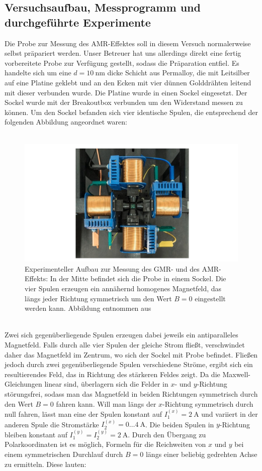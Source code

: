 \documentclass[german,  %
parskip=full,  %
]{scrartcl}
\begin{document}
\subsection{Versuchsaufbau, Messprogramm und durchgeführte Experimente}
Die Probe zur Messung des AMR-Effektes soll in diesem Versuch normalerweise selbst präpariert werden. Unser Betreuer hat uns allerdings direkt eine fertig vorbereitete Probe zur Verfügung gestellt, sodass die Präparation entfiel. Es handelte sich um eine \(d=10 \ \mathrm{nm}\) dicke Schicht aus Permalloy, die mit Leitsilber auf eine Platine geklebt und an den Ecken mit vier dünnen Golddrähten leitend mit dieser verbunden wurde. Die Platine wurde in einen Sockel eingesetzt. Der Sockel wurde mit der Breakoutbox verbunden um den Widerstand messen zu können. Um den Sockel befanden sich vier identische Spulen, die entsprechend der folgenden Abbildung angeordnet waren: \\\\
\begin{figure}[h!]\centering
\includegraphics[width=\textwidth]{Versuchsaufbau.jpg}
\caption{Experimenteller Aufbau zur Messung des GMR- und des AMR-Effekts: In der Mitte befindet sich die Probe in einem Sockel. Die vier Spulen erzeugen ein annähernd homogenes Magnetfeld, das längs jeder Richtung symmetrisch um den Wert \(B=0\) eingestellt werden kann. Abbildung entnommen aus \cite{Versuchsanleitung}}
\end{figure} \\
Zwei sich gegenüberliegende Spulen erzeugen dabei jeweils ein antiparalleles Magnetfeld. Falls durch alle vier Spulen der gleiche Strom fließt, verschwindet daher das Magnetfeld im Zentrum, wo sich der Sockel mit Probe befindet. Fließen jedoch durch zwei gegenüberliegende Spulen verschiedene Ströme, ergibt sich ein resultierendes Feld, das in Richtung des stärkeren Feldes zeigt. Da die Maxwell-Gleichungen linear sind, überlagern sich die Felder in \(x\)- und \(y\)-Richtung störungsfrei, sodass man das Magnetfeld in beiden Richtungen symmetrisch durch den Wert \(B=0\) fahren kann. Will man längs der \(x\)-Richtung symmetrisch durch null fahren, lässt man eine der Spulen konstant auf  \(I_1^{(x)}=2 \ \mathrm{A}\) und variiert in der anderen Spule die Stromstärke \(I_2^{(x)} = 0\hdots 4 \ \mathrm{A}\). Die beiden Spulen in \(y\)-Richtung bleiben konstant auf \(I_1^{(y)} = I_2^{(y)} = 2 \ \mathrm{A}\). Durch den Übergang zu Polarkoordinaten ist es möglich, Formeln für die Reichweiten von \(x\) und \(y\) bei einem symmetrischen Durchlauf durch \(B=0\) längs einer beliebig gedrehten Achse zu ermitteln. Diese lauten:
\end{document}
